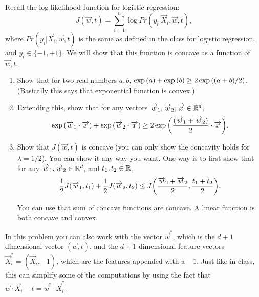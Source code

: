 \documentclass[11pt]{article}
\newenvironment{problem}[2][Problem]{\begin{trivlist}
\item[\hskip \labelsep {\bfseries #1}\hskip \labelsep {\bfseries #2.}]}{\end{trivlist}}
\begin{document}
\begin{problem}{2 (10 points)}
Recall the log-likelihood function for logistic regression:
\[
J(\overrightarrow w, t) = \sum_{i=1}^n \log Pr ( y_i|  \overrightarrow X_i, \overrightarrow w, t), 
\]
where $Pr ( y_i|  \overrightarrow X_i, \overrightarrow w, t)$ is the same as defined in the class for logistic regression, and $y_i\in\{-1,+1\}$. We will show that this function is concave as a function of $\overrightarrow w, t$.
\begin{enumerate}
\item 
Show that for two real numbers $a, b$, $\exp{\left({a}\right)}+\exp{\left({b}\right)}\ge 2 \exp{\left({(a+b)/2}\right)}$. (Basically this says that exponential function is convex.)
\item
Extending this, show that for any vectors $\overrightarrow w_1, \overrightarrow w_2, \overrightarrow x \in\mathbb{R}^d$, 
\[
\exp{\left({\overrightarrow w_1\cdot \overrightarrow x}\right)} + \exp{\left({\overrightarrow w_2\cdot \overrightarrow x}\right)} \ge 2\exp{\left({\frac{(\overrightarrow w_1 + \overrightarrow w_2)}2 \cdot \overrightarrow x}\right)}.
\]
\item
Show that $J(\overrightarrow w, t)$ is concave (you can only show the concavity holds for $\lambda=1/2$). You can show it any way you want. One way is to first show that for any $\overrightarrow w_1, \overrightarrow w_2 \in\mathbb{R}^d$, and $t_1, t_2\in\mathbb{R}$,  
\[
\frac{1}{2}J(\overrightarrow w_1, t_1)+\frac{1}{2}J(\overrightarrow w_2, t_2) \le J{\left({\frac{\overrightarrow w_2+\overrightarrow w_2 }2, \frac{t_1+t_2}2}\right)}.
\]

You can use that sum of concave functions are concave. A linear function is both concave and convex. 
\end{enumerate}

In this problem you can also work with the vector $\overrightarrow w^*$, which is the $d+1$ dimensional vector $(\overrightarrow w, t)$, and the $d+1$ dimensional feature vectors $\overrightarrow X_i^{*} = (\overrightarrow X_i, -1)$, which are the features appended with a $-1$. Just like in class, this can simplify some of the computations by using the fact that $\overrightarrow w\cdot \overrightarrow X_i -t = \overrightarrow w^{*}\cdot \overrightarrow X_i^*$. 
\end{problem}
\end{document}
